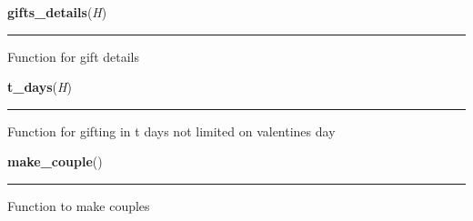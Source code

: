     \label{main:gifts_details}

    \vspace{0.5ex}

\hspace{.8\funcindent}\begin{boxedminipage}{\funcwidth}

    \raggedright \textbf{gifts\_details}(\textit{H})

    \vspace{-1.5ex}

    \rule{\textwidth}{0.5\fboxrule}
\setlength{\parskip}{2ex}
    Function for gift details

\setlength{\parskip}{1ex}
    \end{boxedminipage}

    \label{main:t_days}

    \vspace{0.5ex}

\hspace{.8\funcindent}\begin{boxedminipage}{\funcwidth}

    \raggedright \textbf{t\_days}(\textit{H})

    \vspace{-1.5ex}

    \rule{\textwidth}{0.5\fboxrule}
\setlength{\parskip}{2ex}
    Function for gifting in t days not limited on valentines day

\setlength{\parskip}{1ex}
    \end{boxedminipage}

    \label{main:make_couple}

    \vspace{0.5ex}

\hspace{.8\funcindent}\begin{boxedminipage}{\funcwidth}

    \raggedright \textbf{make\_couple}()

    \vspace{-1.5ex}

    \rule{\textwidth}{0.5\fboxrule}
\setlength{\parskip}{2ex}
    Function to make couples

\setlength{\parskip}{1ex}
    \end{boxedminipage}

